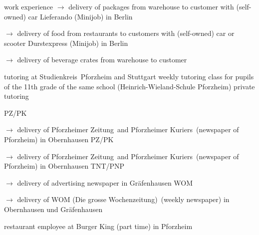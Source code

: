 \begin{rubric}{\textcolor{black!20!blue!100}{work experience}}
			\setlength{\hangindent}{\widthof{$\rightarrow$ }}
			$\rightarrow$ delivery of packages from warehouse to customer with (self-owned) car
		\entry*[24/10/2020 --- 04/01/2021]
			Lieferando (Minijob) in Berlin
			
			\setlength{\hangindent}{\widthof{$\rightarrow$ }}
			$\rightarrow$ delivery of food from restaurants to customers with (self-owned) car or scooter
		\entry*[17/07/2020 --- 18/10/2020]
			Durstexpress (Minijob) in Berlin
			
			\setlength{\hangindent}{\widthof{$\rightarrow$ }}
			$\rightarrow$ delivery of beverage crates from warehouse to customer
				
		\entry*[10/2015 --- 01/2016]
			tutoring at \glqq Studienkreis\grqq\ Pforzheim and Stuttgart
		\entry*[10/2011 --- 06/2012]
			weekly tutoring class for pupils of the 11th grade of the same school (Heinrich-Wieland-Schule Pforzheim)
		\entry*[\phantom{10/}2010 --- 2016]
			private tutoring
			
		\entry*[08/2015 --- 09/2015]
			PZ/PK
			
			\setlength{\hangindent}{\widthof{$\rightarrow$ }}
			$\rightarrow$ delivery of \glqq Pforzheimer Zeitung\grqq\ and \glqq Pforzheimer Kuriers\grqq\ (newspaper of Pforzheim) in Obernhausen
		\entry*[08/2012 --- 09/2012]
			PZ/PK
			
			\setlength{\hangindent}{\widthof{$\rightarrow$ }}
			$\rightarrow$ delivery of \glqq Pforzheimer Zeitung\grqq\ and \glqq Pforzheimer Kuriers\grqq\ (newspaper of Pforzheim) in Obernhausen
		\entry*[06/2009 --- 10/2010]
			TNT/PNP
			
			\setlength{\hangindent}{\widthof{$\rightarrow$ }}
			$\rightarrow$ delivery of advertising newspaper in Gräfenhausen
		\entry*[06/2007 --- 12/2008]
			WOM
			
			\setlength{\hangindent}{\widthof{$\rightarrow$ }}
			$\rightarrow$ delivery of \glqq WOM (Die grosse Wochenzeitung)\grqq\ (weekly newspaper) in Obernhausen und Gräfenhausen
			
		\entry*[04/2012 --- 10/2012]
			restaurant employee at Burger King (part time) in Pforzheim
\end{rubric}
\versionLanguageEnd